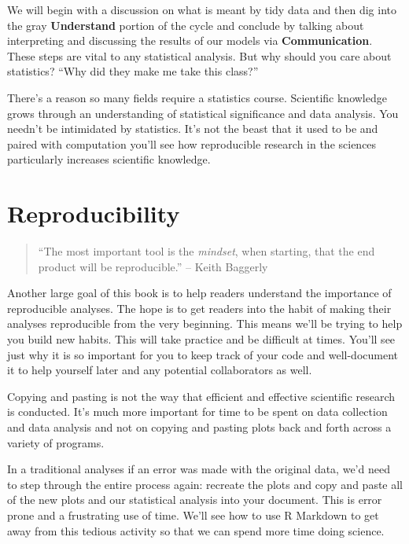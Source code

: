 \documentclass[]{tufte-book}
\begin{document}
We will begin with a discussion on what is meant by tidy data and then
dig into the gray \textbf{Understand} portion of the cycle and conclude
by talking about interpreting and discussing the results of our models
via \textbf{Communication}. These steps are vital to any statistical
analysis. But why should you care about statistics? ``Why did they make
me take this class?''

There's a reason so many fields require a statistics course. Scientific
knowledge grows through an understanding of statistical significance and
data analysis. You needn't be intimidated by statistics. It's not the
beast that it used to be and paired with computation you'll see how
reproducible research in the sciences particularly increases scientific
knowledge.

\section{Reproducibility}\label{reproducibility}

\begin{quote}
``The most important tool is the \emph{mindset}, when starting, that the
end product will be reproducible.'' -- Keith Baggerly
\end{quote}

Another large goal of this book is to help readers understand the
importance of reproducible analyses. The hope is to get readers into the
habit of making their analyses reproducible from the very beginning.
This means we'll be trying to help you build new habits. This will take
practice and be difficult at times. You'll see just why it is so
important for you to keep track of your code and well-document it to
help yourself later and any potential collaborators as well.

Copying and pasting is not the way that efficient and effective
scientific research is conducted. It's much more important for time to
be spent on data collection and data analysis and not on copying and
pasting plots back and forth across a variety of programs.

In a traditional analyses if an error was made with the original data,
we'd need to step through the entire process again: recreate the plots
and copy and paste all of the new plots and our statistical analysis
into your document. This is error prone and a frustrating use of time.
We'll see how to use R Markdown to get away from this tedious activity
so that we can spend more time doing science.
\end{document}
